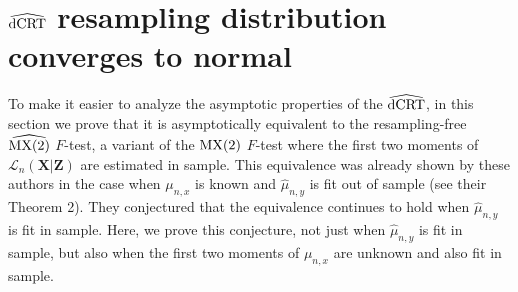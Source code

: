 \documentclass[aos]{imsart}
\theoremstyle{plain}
\theoremstyle{remark}
\newcommand{\prx}{\bm X}								%
\newcommand{\prz}{\bm Z}								%
\newcommand{\law}{\mathcal L}							%
\newcommand{\dCRThat}{\widehat{\textnormal{dCRT}}}		%
\newcommand{\MXtwohat}{\widehat{\textnormal{MX(2)}}}	%
\newcommand{\MXtwo}{\textnormal{MX(2)}}                 %
\begin{document}
\section{$\dCRThat$ resampling distribution converges to normal} \label{sec:conv-to-normal}

To make it easier to analyze the asymptotic properties of the $\dCRThat$, in this section we prove that it is asymptotically equivalent to the resampling-free $\MXtwohat$ $F$-test, a variant of the $\MXtwo$ $F$-test \citep{Katsevich2020a} where the first two moments of $\law_n(\prx|\prz)$ are estimated in sample. This equivalence was already shown by these authors in the case when $\mu_{n,x}$ is known and $\widehat \mu_{n,y}$ is fit out of sample (see their Theorem 2). They conjectured that the equivalence continues to hold when $\widehat \mu_{n,y}$ is fit in sample. Here, we prove this conjecture, not just when $\widehat \mu_{n,y}$ is fit in sample, but also when the first two moments of $\mu_{n,x}$ are unknown and also fit in sample.
\end{document}
